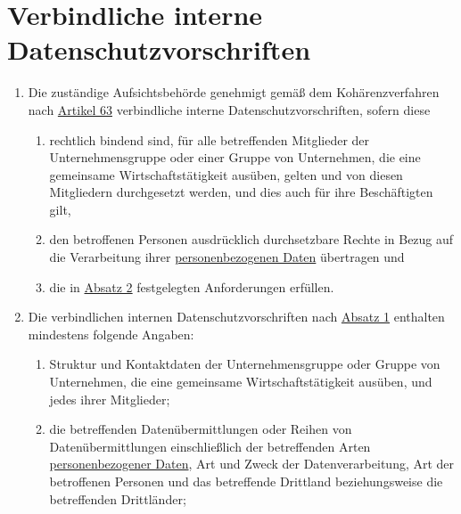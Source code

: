 \chapter{Verbindliche interne Datenschutzvorschriften}
\label{ch:47}


\begin{enumerate}

  \item Die zuständige Aufsichtsbehörde genehmigt gemäß dem Kohärenzverfahren nach \hyperref[ch:63]{Artikel 63}
   verbindliche interne Datenschutzvorschriften, sofern diese
  \label{itm:47-1}

  \begin{enumerate}
  
    \item rechtlich bindend sind, für alle betreffenden Mitglieder der Unternehmensgruppe oder einer Gruppe von
     Unternehmen, die eine gemeinsame Wirtschaftstätigkeit ausüben, gelten und von diesen Mitgliedern durchgesetzt
     werden, und dies auch für ihre Beschäftigten gilt,
    \label{itm:47-1a}

    \item den betroffenen Personen ausdrücklich durchsetzbare Rechte in Bezug auf die Verarbeitung ihrer
     \hyperref[itm:04-1]{personenbezogenen Daten} übertragen und
    \label{itm:47-1b}

    \item die in \hyperref[itm:47-2]{Absatz 2} festgelegten Anforderungen erfüllen.
    \label{itm:47-1c}

  \end{enumerate}

  \item Die verbindlichen internen Datenschutzvorschriften nach \hyperref[itm:47-1]{Absatz 1} enthalten mindestens
   folgende Angaben:
  \label{itm:47-2}

  \begin{enumerate}
  
    \item Struktur und Kontaktdaten der Unternehmensgruppe oder Gruppe von Unternehmen, die eine gemeinsame
     Wirtschaftstätigkeit ausüben, und jedes ihrer Mitglieder;
    \label{itm:4722a}

    \item die betreffenden Datenübermittlungen oder Reihen von Datenübermittlungen einschließlich der betreffenden Arten
     \hyperref[itm:04-1]{personenbezogener Daten}, Art und Zweck der Datenverarbeitung, Art der betroffenen Personen und das betreffende
     Drittland beziehungsweise die betreffenden Drittländer;
    \label{itm:47-2b}


\end{enumerate}
\end{enumerate}
